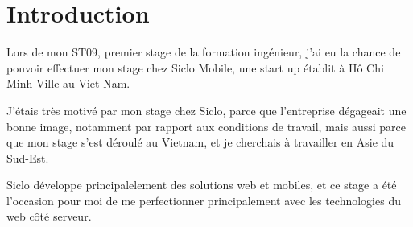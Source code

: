 \documentclass[main.tex]{subfiles}
\begin{document}
    \section*{Introduction}
    Lors de mon ST09, premier stage de la formation ingénieur,
    j'ai eu la chance de pouvoir effectuer mon stage chez Siclo Mobile,
    une start up établit à Hô Chi Minh Ville au Viet Nam.

    J'étais très motivé par mon stage chez Siclo, parce que l'entreprise dégageait une bonne image, notamment par rapport aux conditions de travail, mais aussi parce que mon stage s'est déroulé au Vietnam, et je cherchais à travailler en Asie du Sud-Est.

    Siclo développe principalelement des solutions web et mobiles, et ce stage a été l'occasion pour moi de me perfectionner principalement avec les technologies du web côté serveur.
\end{document}
